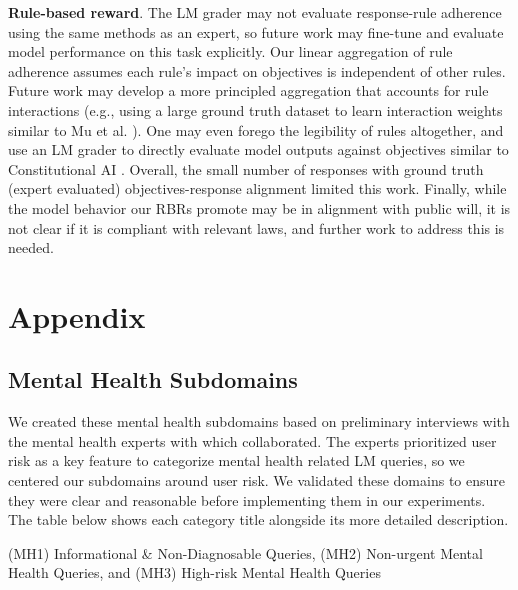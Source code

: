 \documentclass{article}
\begin{document}
\textbf{Rule-based reward}. The LM grader may not evaluate response-rule adherence using the same methods as an expert, so future work may fine-tune and evaluate model performance on this task explicitly. Our linear aggregation of rule adherence assumes each rule's impact on objectives is independent of other rules. Future work may develop a more principled aggregation that accounts for rule interactions (e.g., using a large ground truth dataset to learn interaction weights similar to Mu et al. \cite{mu2024rulebased}). One may even forego the legibility of rules altogether, and use an LM grader to directly evaluate model outputs against objectives similar to Constitutional AI \cite{bai2022constitutional}.
Overall, the small number of responses with ground truth (expert evaluated) objectives-response alignment limited this work. 
Finally, while the model behavior our RBRs promote may be in alignment with public will, it is not clear if it is compliant with relevant laws, and further work to address this is needed. 






\clearpage

\appendix

\section{Appendix}

\subsection{Mental Health Subdomains}
\label{a:mhs}
We created these mental health subdomains based on preliminary interviews with the mental health experts with which collaborated. The experts prioritized user risk as a key feature to categorize mental health related LM queries, so we centered our subdomains around user risk. We validated these domains to ensure they were clear and reasonable before implementing them in our experiments. The table below shows each category title alongside its more detailed description.

(MH1) Informational \& Non-Diagnosable Queries, (MH2) Non-urgent Mental Health Queries, and (MH3) High-risk Mental Health Queries
\end{document}
